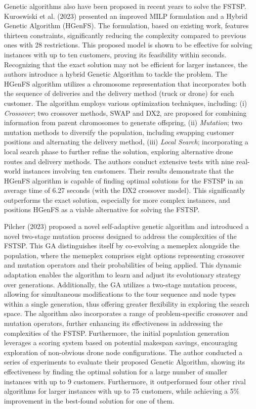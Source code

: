 \documentclass{article}
\begin{document}
	Genetic algorithms also have been proposed in recent years to solve the FSTSP. Kuroswiski et al. (2023) presented an improved MILP formulation and a Hybrid Genetic Algorithm (HGenFS). The formulation, based on existing work, features thirteen constraints, significantly reducing the complexity compared to previous ones with 28 restrictions. This proposed model is shown to be effective for solving instances with up to ten customers, proving its feasibility within seconds. Recognizing that the exact solution may not be efficient for larger instances, the authors introduce a hybrid Genetic Algorithm to tackle the problem. The HGenFS algorithm utilizes a chromosome representation that incorporates both the sequence of deliveries and the delivery method (truck or drone) for each customer. The algorithm employs various optimization techniques, including:  (i) \textit{Crossover}; two crossover methods, SWAP and DX2, are proposed for combining information from parent chromosomes to generate offspring, (ii) \textit{Mutation}; two mutation methods to diversify the population, including swapping customer positions and alternating the delivery method, (iii) \textit{Local Search}; incorporating a local search phase to further refine the solution, exploring alternative drone routes and delivery methods. The authors conduct extensive tests with nine real-world instances involving ten customers. Their results demonstrate that the HGenFS algorithm is capable of finding optimal solutions for the FSTSP in an average time of 6.27 seconds (with the DX2 crossover model). This significantly outperforms the exact solution, especially for more complex instances, and positions HGenFS as a viable alternative for solving the FSTSP.
	\par
	Pilcher (2023) proposed a novel self-adaptive genetic algorithm and introduced a novel two-stage mutation process designed to address the complexities of the FSTSP. This GA distinguishes itself by co-evolving a memeplex alongside the population, where the memeplex comprises eight options representing crossover and mutation operators and their probabilities of being applied. This dynamic adaptation enables the algorithm to learn and adjust its evolutionary strategy over generations. Additionally, the GA utilizes a two-stage mutation process, allowing for simultaneous modifications to the tour sequence and node types within a single generation, thus offering greater flexibility in exploring the search space. The algorithm also incorporates a range of problem-specific crossover and mutation operators, further enhancing its effectiveness in addressing the complexities of the FSTSP. Furthermore, the initial population generation leverages a scoring system based on potential makespan savings, encouraging exploration of non-obvious drone node configurations. The author conducted a series of experiments to evaluate their proposed Genetic Algorithm, showing its effectiveness by finding the optimal solution for a large number of smaller instances with up to 9 customers. Furthermore, it outperformed four other rival algorithms for larger instances with up to 75 customers, while achieving a 5\% improvement in the best-found solution for one of them.
	
\end{document}
